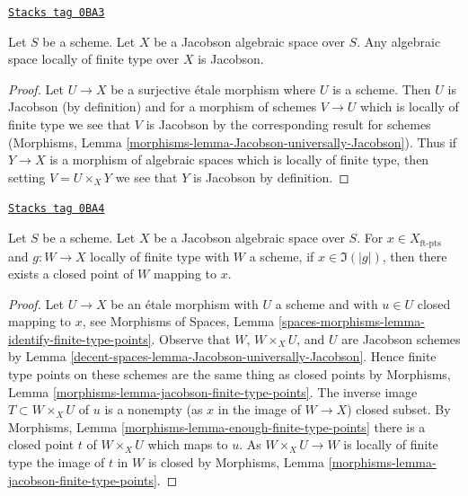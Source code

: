 \begin{lemma}
\label{decent-spaces-lemma-Jacobson-universally-Jacobson}
\href{https://stacks.math.columbia.edu/tag/0BA3}{\texttt{Stacks tag 0BA3}}

Let $S$ be a scheme. Let $X$ be a Jacobson algebraic space over $S$.
Any algebraic space locally of finite type over $X$ is Jacobson.
\end{lemma}

\begin{proof}
Let $U \to X$ be a surjective \'etale morphism where $U$ is a scheme.
Then $U$ is Jacobson (by definition) and for a morphism of schemes $V \to U$
which is locally of finite type we see that $V$ is Jacobson by the
corresponding result for schemes (Morphisms, Lemma
\ref{morphisms-lemma-Jacobson-universally-Jacobson}).
Thus if $Y \to X$ is a morphism of algebraic spaces which is locally
of finite type, then setting $V = U \times_X Y$ we see that
$Y$ is Jacobson by definition.
\end{proof}

\begin{lemma}
\label{decent-spaces-lemma-Jacobson-ft-points-lift-to-closed}
\href{https://stacks.math.columbia.edu/tag/0BA4}{\texttt{Stacks tag 0BA4}}

Let $S$ be a scheme. Let $X$ be a Jacobson algebraic space over $S$.
For $x \in X_{\text{ft-pts}}$ and $g : W \to X$ locally of finite type
with $W$ a scheme, if $x \in \Im(|g|)$, then there exists a closed
point of $W$ mapping to $x$.
\end{lemma}

\begin{proof}
Let $U \to X$ be an \'etale morphism with $U$ a scheme and with $u \in U$
closed mapping to $x$, see
Morphisms of Spaces, Lemma
\ref{spaces-morphisms-lemma-identify-finite-type-points}.
Observe that $W$, $W \times_X U$, and $U$ are Jacobson schemes
by Lemma \ref{decent-spaces-lemma-Jacobson-universally-Jacobson}.
Hence finite type points on these schemes
are the same thing as closed points by
Morphisms, Lemma \ref{morphisms-lemma-jacobson-finite-type-points}.
The inverse image $T \subset W \times_X U$ of $u$ is a nonempty
(as $x$ in the image of $W \to X$) closed subset.
By Morphisms, Lemma \ref{morphisms-lemma-enough-finite-type-points}
there is a closed point $t$ of $W \times_X U$ which maps to $u$.
As $W \times_X U \to W$ is locally of finite type
the image of $t$ in $W$ is closed by
Morphisms, Lemma \ref{morphisms-lemma-jacobson-finite-type-points}.
\end{proof}

